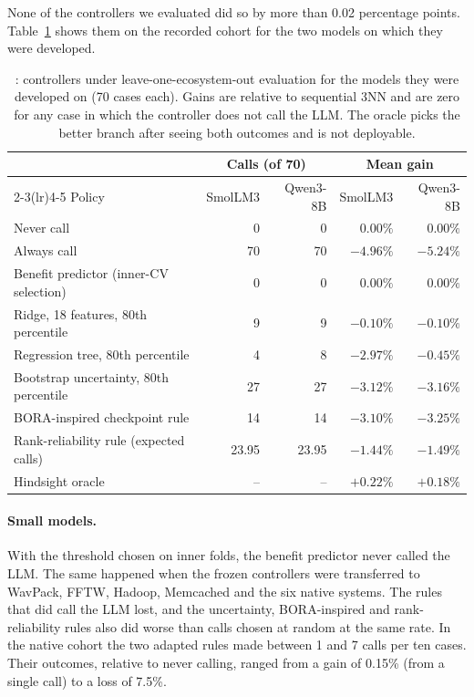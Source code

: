 None of the controllers we evaluated did so by more than 0.02 percentage points. Table~\ref{tab:rq4} shows them on the recorded cohort for the two models on which they were developed.

\begin{table}[t]
\centering
\caption{: controllers under leave-one-ecosystem-out evaluation for the models they were developed on (70 cases each). Gains are relative to sequential 3NN and are zero for any case in which the controller does not call the LLM. The oracle picks the better branch after seeing both outcomes and is not deployable.}
\label{tab:rq4}
\small
\begin{tabular}{lrrrr}
\toprule
 & \multicolumn{2}{c}{Calls (of 70)} & \multicolumn{2}{c}{Mean gain} \\
\cmidrule(lr){2-3}\cmidrule(lr){4-5}
Policy & SmolLM3 & Qwen3-8B & SmolLM3 & Qwen3-8B \\
\midrule
Never call & 0 & 0 & $0.00\%$ & $0.00\%$ \\
Always call & 70 & 70 & $-4.96\%$ & $-5.24\%$ \\
Benefit predictor (inner-CV selection) & 0 & 0 & $0.00\%$ & $0.00\%$ \\
Ridge, 18 features, 80th percentile & 9 & 9 & $-0.10\%$ & $-0.10\%$ \\
Regression tree, 80th percentile & 4 & 8 & $-2.97\%$ & $-0.45\%$ \\
Bootstrap uncertainty, 80th percentile & 27 & 27 & $-3.12\%$ & $-3.16\%$ \\
BORA-inspired checkpoint rule & 14 & 14 & $-3.10\%$ & $-3.25\%$ \\
Rank-reliability rule (expected calls) & 23.95 & 23.95 & $-1.44\%$ & $-1.49\%$ \\
\midrule
Hindsight oracle & -- & -- & $+0.22\%$ & $+0.18\%$ \\
\bottomrule
\end{tabular}
\end{table}

\paragraph{Small models.} With the threshold chosen on inner folds, the benefit predictor never called the LLM. The same happened when the frozen controllers were transferred to WavPack, FFTW, Hadoop, Memcached and the six native systems. The rules that did call the LLM lost, and the uncertainty, BORA-inspired and rank-reliability rules also did worse than calls chosen at random at the same rate. In the native cohort the two adapted rules made between 1 and 7 calls per ten cases. Their outcomes, relative to never calling, ranged from a gain of 0.15\% (from a single call) to a loss of 7.5\%.

